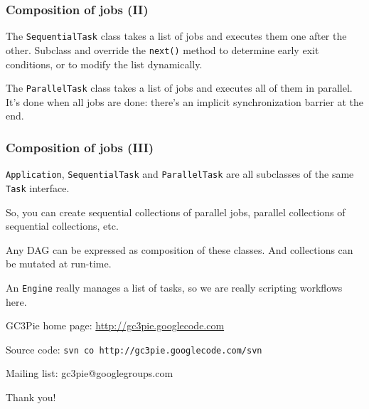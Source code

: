 \documentclass[presentation]{beamer}
\begin{document}
\begin{frame}
  \frametitle{Composition of jobs (II)}
  \label{sec-24}

  The \texttt{SequentialTask} class takes a list of jobs and executes them
  one after the other. Subclass and override the \texttt{next()} method to
  determine early exit conditions, or to modify the list dynamically.

  The \texttt{ParallelTask} class takes a list of jobs and executes all of
  them in parallel.  It's done when all jobs are done: there's an
  implicit synchronization barrier at the end.
  
\end{frame}

\begin{frame}
  \frametitle{Composition of jobs (III)}
  \label{sec-25}

  \texttt{Application}, \texttt{SequentialTask} and \texttt{ParallelTask} are all
  subclasses of the same \texttt{Task} interface.

  So, you can create sequential collections of parallel jobs, parallel
  collections of sequential collections, etc.

  Any DAG can be expressed as composition of these classes.
  And collections can be mutated at run-time.

  An \texttt{Engine} really manages a list of tasks, so we are really
  scripting workflows here.
\end{frame}

\begin{frame}
\begin{center}
  GC3Pie home page: \href{http://gc3pie.googlecode.com}{http://gc3pie.googlecode.com}

  Source code: \texttt{svn co http://gc3pie.googlecode.com/svn}

  Mailing list: gc3pie@googlegroups.com

  Thank you!
\end{center}
\end{frame}
\end{document}
